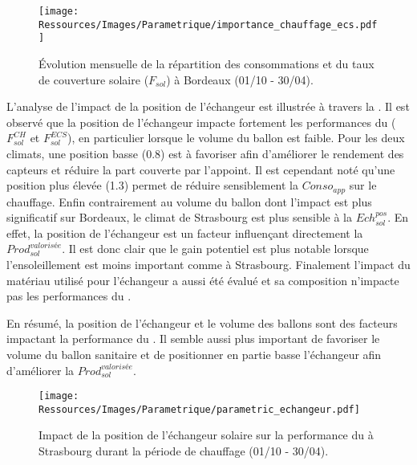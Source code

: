 \begin{figure}
    \centering
    \texttt{[image: Ressources/Images/Parametrique/importance\_chauffage\_ecs.pdf]}
    \caption[Évolution mensuelle de la répartition des consommations à Bordeaux]
            {Évolution mensuelle de la répartition des consommations et du taux
             de couverture solaire ($F_{sol}$) à Bordeaux (01/10 - 30/04).}
    \label{fig:importance_chauffage_ecs}
\end{figure}

L’analyse de l’impact de la position de l’échangeur est illustrée à travers la
. Il est observé que la position de l’échangeur impacte
fortement les performances du  ($F_{sol}^{CH}$ et $F_{sol}^{ECS}$), en particulier
lorsque le volume du ballon est faible. Pour les deux climats, une position basse
(\num{0.8}) est à favoriser afin d’améliorer le rendement des capteurs et réduire la part
couverte par l’appoint. Il est cependant noté qu’une position plus élevée (\num{1.3})
permet de réduire sensiblement la $Conso_{app}$ sur le chauffage.
Enfin contrairement au volume du ballon dont l’impact est plus significatif sur Bordeaux, le
climat de Strasbourg est plus sensible à la $Ech_{sol}^{pos}$. En effet, la position de l’échangeur
est un facteur influençant directement la $Prod_{sol}^{valorisée}$. Il est donc clair que le gain potentiel
est plus notable lorsque l’ensoleillement est moins important comme à Strasbourg.
Finalement l’impact du matériau utilisé pour l’échangeur a aussi été évalué et sa
composition n’impacte pas les performances du .

En résumé, la position de l’échangeur et le volume des ballons sont des facteurs
impactant la performance du . Il semble aussi plus important de favoriser
le volume du ballon sanitaire et de positionner en partie basse l’échangeur afin
d’améliorer la $Prod_{sol}^{valorisée}$.

\begin{figure}
    \centering
    \texttt{[image: Ressources/Images/Parametrique/parametric\_echangeur.pdf]}
    \caption[Impact de la position de l’échangeur solaire sur la performance du ]
            {Impact de la position de l’échangeur solaire sur la performance
             du  à Strasbourg durant la période de chauffage (01/10 - 30/04).}
    \label{fig:impact_pos_ech}
\end{figure}


